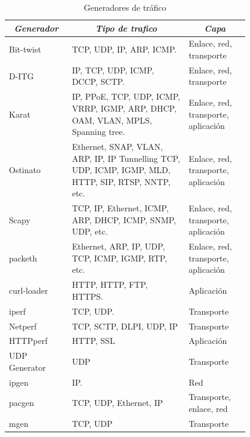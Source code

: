 \documentclass[12pt]{article}
\begin{document}
\begin{table}[htbp]
\footnotesize
\centering
\begin{tabular}{|p{0.2\linewidth}|p{0.4\linewidth}|p{0.2\linewidth}|}\hline
\multicolumn{1}{|c|}{\textit{\textbf{Generador}}} & 
\multicolumn{1}{|c|}{\textit{\textbf{Tipo de trafico}}} &
\multicolumn{1}{|c|}{\textit{\textbf{Capa}}}  \tabularnewline \hline

Bit-twist &
TCP, UDP, IP, ARP, ICMP. & 
Enlace, red, transporte  
\tabularnewline \hline

D-ITG &
IP, TCP, UDP, ICMP, DCCP, SCTP. & 
Enlace, red, transporte  
\tabularnewline \hline

Karat &
IP, PPoE, TCP, UDP, ICMP, VRRP, IGMP, ARP, DHCP, OAM, VLAN, MPLS, Spanning tree.
 & 
Enlace, red, transporte, aplicación  
\tabularnewline \hline

Ostinato &
Ethernet, SNAP, VLAN, ARP, IP, IP Tunnelling TCP, UDP, ICMP, IGMP, MLD, HTTP, SIP, RTSP, NNTP, etc. & 
Enlace, red, transporte, aplicación  
\tabularnewline \hline

Scapy &
TCP, IP, Ethernet, ICMP, ARP, DHCP, ICMP, SNMP, UDP, etc. & 
Enlace, red, transporte, aplicación  
\tabularnewline \hline

packeth &
Ethernet, ARP, IP, UDP, TCP, ICMP, IGMP, RTP, etc. & 
Enlace, red, transporte, aplicación  
\tabularnewline \hline

curl-loader &
HTTP, HTTP, FTP, HTTPS. & 
Aplicación  
\tabularnewline \hline

iperf &
TCP, UDP. & 
Transporte  
\tabularnewline \hline

Netperf &
TCP, SCTP, DLPI, UDP, IP  & 
Transporte  
\tabularnewline \hline

HTTPperf &
HTTP, SSL & 
Aplicación  
\tabularnewline \hline

UDP Generator &
UDP & 
Transporte  
\tabularnewline \hline

ipgen &
IP. & 
Red 
\tabularnewline \hline

pacgen &
TCP, UDP, Ethernet, IP & 
Transporte, enlace, red  
\tabularnewline \hline


mgen &
TCP, UDP & 
Transporte 
\tabularnewline \hline

\end{tabular}
\caption{Generadores de tráfico} \label{tab:sometab}
\end{table} 
\end{document}
